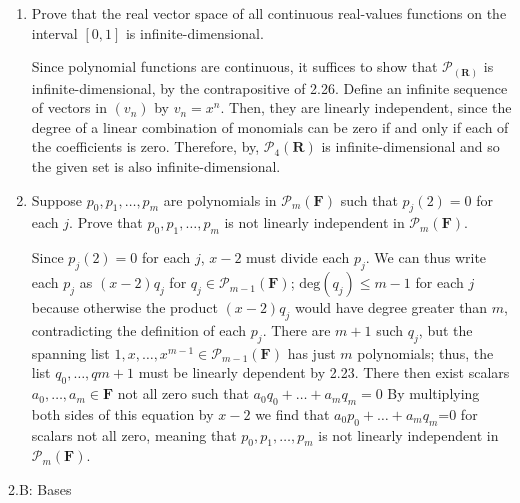 \documentclass{book}
\begin{document}
\begin{enumerate}
\item Prove that the real vector space of all continuous real-values functions on the interval \([0,1]\) is infinite-dimensional.

Since polynomial functions are continuous, it suffices to show that \(\mathcal{P}_(\textbf{R})\) is infinite-dimensional, by the contrapositive of 2.26.  Define an infinite sequence of vectors in \((v_n)\) by \(v_n=x^n\).  Then, they are linearly independent, since the degree of a linear combination of monomials can be zero if and only if each of the coefficients is zero.  Therefore, by, \(\mathcal{P}_4(\textbf{R})\) is infinite-dimensional and so the given set is also infinite-dimensional.

\item Suppose \(p_0, p_1,\dots,p_m\) are polynomials in \(\mathcal{P}_m(\textbf{F})\) such that \(p_j(2)=0\) for each \(j\).  Prove that \(p_0, p_1,\dots,p_m\) is not linearly independent in \(\mathcal{P}_m(\textbf{F})\).

Since \(p_j(2)=0\) for each \(j\), \(x-2\) must divide each \(p_j\).  We can thus write each \(p_j\) as \((x-2)q_j\) for \(q_j \in \mathcal{P}_{m-1}(\textbf{F})\); \(\textrm{deg}(q_j) \leq m-1\) for each \(j\) because otherwise the product \((x-2)q_j\) would have degree greater than \(m\), contradicting the definition of each \(p_j\).  There are \(m+1\) such \(q_j\), but the spanning list \(1,x,\dots,x^{m-1} \in \mathcal{P}_{m-1}(\textbf{F})\) has just \(m\) polynomials; thus, the list \(q_0,\dots,q{m+1}\) must be linearly dependent by 2.23.  There then exist scalars \(a_0,\dots,a_m \in \textbf{F}\) not all zero such that \(a_0q_0+\dots+a_mq_m=0\)  By multiplying both sides of this equation by \(x-2\) we find that \(a_0p_0+\dots+a_mq_m\)=0 for scalars not all zero, meaning that \(p_0, p_1,\dots,p_m\) is not linearly independent in \(\mathcal{P}_m(\textbf{F})\).

\end{enumerate}

2.B: Bases
\end{document}
